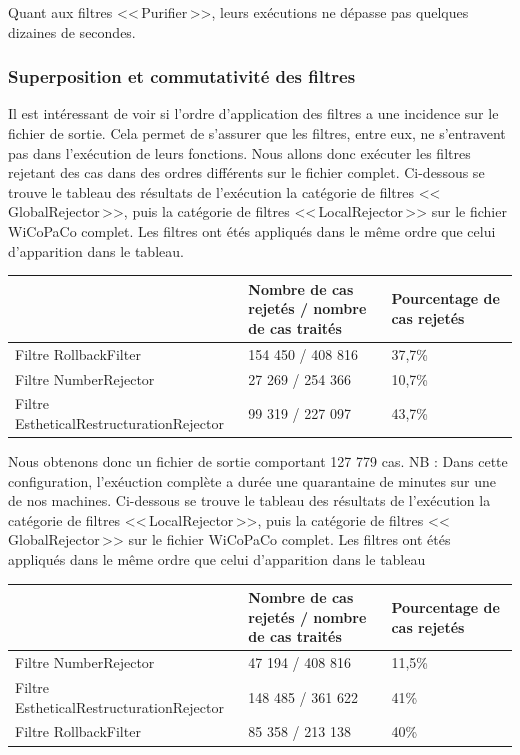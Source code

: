 \documentclass[11pt]{article}
\begin{document}
Quant aux filtres <<\,Purifier\,>>, leurs ex\'{e}cutions ne d\'{e}passe pas quelques dizaines de secondes.



\subsubsection{Superposition et commutativit\'{e} des filtres}
Il est int\'{e}ressant de voir si l'ordre d'application des filtres a une incidence sur le fichier de sortie. Cela permet de s'assurer que les filtres, entre eux, ne s'entravent pas dans l'ex\'{e}cution de leurs fonctions. 
Nous allons donc ex\'{e}cuter les filtres rejetant des cas dans des ordres diff\'{e}rents sur le fichier complet.
\newline
\newline
Ci-dessous se trouve le tableau des r\'{e}sultats de l'ex\'{e}cution la cat\'{e}gorie de filtres <<\,GlobalRejector\,>>, puis la cat\'{e}gorie de filtres <<\,LocalRejector\,>> sur le fichier WiCoPaCo complet. Les filtres ont \'{e}t\'{e}s appliqu\'{e}s dans le m\^{e}me ordre que celui d'apparition dans le tableau.
\begin{center}
\begin{tabular}{|M{6cm}|M{5cm}|M{6cm}|}
   \hline
    \, &Nombre de cas rejet\'{e}s / nombre de cas trait\'{e}s & Pourcentage de cas rejet\'{e}s \tabularnewline
   \hline
    Filtre RollbackFilter & 154 450 / 408 816 & 37,7\% \tabularnewline
   \hline
    Filtre NumberRejector & 27 269 / 254 366 & 10,7\% \tabularnewline
\hline
Filtre EstheticalRestructurationRejector & 99 319 / 227 097 & 43,7\% \tabularnewline
\hline
\end{tabular}
\end{center}
Nous obtenons donc un fichier de sortie comportant 127 779 cas.
\newline
NB : Dans cette configuration, l'ex\'{e}uction compl\`{e}te a dur\'{e}e une quarantaine de minutes sur une de nos machines.
\newline
\newline
Ci-dessous se trouve le tableau des r\'{e}sultats de l'ex\'{e}cution la cat\'{e}gorie de filtres <<\,LocalRejector\,>>,  puis la cat\'{e}gorie de filtres <<\,GlobalRejector\,>> sur le fichier WiCoPaCo complet. Les filtres ont \'{e}t\'{e}s appliqu\'{e}s dans le m\^{e}me ordre que celui d'apparition dans le tableau
\begin{center}
\begin{tabular}{|M{6cm}|M{5cm}|M{6cm}|}
   \hline
    \, &Nombre de cas rejet\'{e}s / nombre de cas trait\'{e}s & Pourcentage de cas rejet\'{e}s \tabularnewline
   \hline
    Filtre NumberRejector & 47 194 / 408 816 & 11,5\% \tabularnewline
\hline
Filtre EstheticalRestructurationRejector & 148 485 / 361 622 & 41\% \tabularnewline
 \hline
    Filtre RollbackFilter & 85 358 / 213 138 & 40\% \tabularnewline
\hline
\end{tabular}
\end{center}
\end{document}
